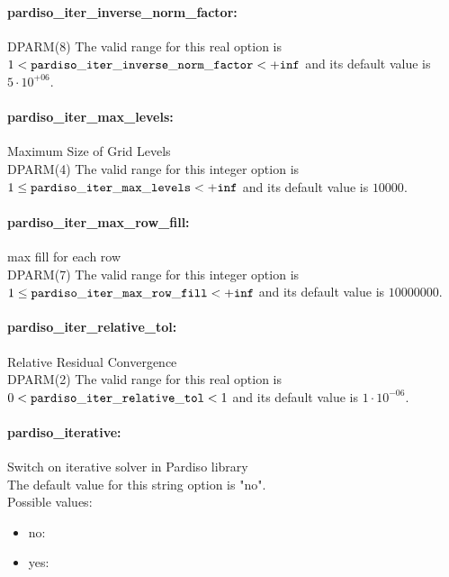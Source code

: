 \paragraph{pardiso\_iter\_inverse\_norm\_factor:}\label{sec:pardiso_iter_inverse_norm_factor}  $\;$ \\
 DPARM(8) The valid range for this real option is 
$1 <  {\tt pardiso\_iter\_inverse\_norm\_factor } <  {\tt +inf}$
and its default value is $5 \cdot 10^{+06}$.


\paragraph{pardiso\_iter\_max\_levels:}\label{sec:pardiso_iter_max_levels} Maximum Size of Grid Levels $\;$ \\
 DPARM(4) The valid range for this integer option is
$1 \le {\tt pardiso\_iter\_max\_levels } <  {\tt +inf}$
and its default value is $10000$.


\paragraph{pardiso\_iter\_max\_row\_fill:}\label{sec:pardiso_iter_max_row_fill} max fill for each row $\;$ \\
 DPARM(7) The valid range for this integer option is
$1 \le {\tt pardiso\_iter\_max\_row\_fill } <  {\tt +inf}$
and its default value is $10000000$.


\paragraph{pardiso\_iter\_relative\_tol:}\label{sec:pardiso_iter_relative_tol} Relative Residual Convergence $\;$ \\
 DPARM(2) The valid range for this real option is 
$0 <  {\tt pardiso\_iter\_relative\_tol } <  1$
and its default value is $1 \cdot 10^{-06}$.


\paragraph{pardiso\_iterative:}\label{sec:pardiso_iterative} Switch on iterative solver in Pardiso library $\;$ \\

The default value for this string option is "no".
\\ 
Possible values:
\begin{itemize}
   \item no: 
   \item yes: 
\end{itemize}

